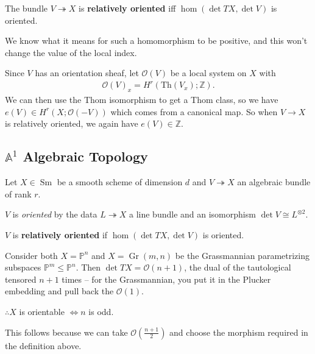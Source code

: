 \begin{definition}

The bundle \(V\twoheadrightarrow X\) is \textbf{relatively oriented} iff
\(\hom(\det TX, \det V)\) is oriented.

\end{definition}

We know what it means for such a homomorphism to be positive, and this
won't change the value of the local index.

Since \(V\) has an orientation sheaf, let \(\mathcal O(V)\) be a local
system on \(X\) with
\begin{align*}
\mathcal O(V)_x = H^r(\text{Th}(V_x); {\mathbb{Z}})
.\end{align*}
We can then use the Thom isomorphism to get a Thom class, so we have
\(e(V) \in H^r(X; \mathcal O(-V))\) which comes from a canonical map. So
when \(V\to X\) is relatively oriented, we again have
\(e(V) \in {\mathbb{Z}}\).

\hypertarget{mathbba1-algebraic-topology}{%
\subsection{\texorpdfstring{\({\mathbb{A}}^1\) Algebraic
Topology}{\{\textbackslash mathbb\{A\}\}\^{}1 Algebraic Topology}}\label{mathbba1-algebraic-topology}}

Let \(X\in{\operatorname{Sm}}\) be a smooth scheme of dimension \(d\)
and \(V\twoheadrightarrow X\) an algebraic bundle of rank \(r\).

\begin{definition}

\(V\) is \emph{oriented} by the data \(L\twoheadrightarrow X\) a line
bundle and an isomorphism \(\det V \cong L^{\otimes 2}\).

\end{definition}

\begin{definition}

\(V\) is \textbf{relatively oriented} if \(\hom(\det TX, \det V)\) is
oriented.

\end{definition}

\begin{example}[?]

Consider both \(X = {\mathbb{P}}^n\) and
\(X = {\operatorname{Gr}}(m,n)\) be the Grassmannian parametrizing
subspaces \({\mathbb{P}}^m \leq {\mathbb{P}}^n\). Then
\(\det TX = \mathcal O(n+1)\), the dual of the tautological tensored
\(n+1\) times -- for the Grassmannian, you put it in the Plucker
embedding and pull back the \(\mathcal O(1)\).

\(\therefore X\) is orientable \(\iff n\) is odd.

This follows because we can take \(\mathcal O( \frac{n+1} {2})\) and
choose the morphism required in the definition above.

\end{example}

